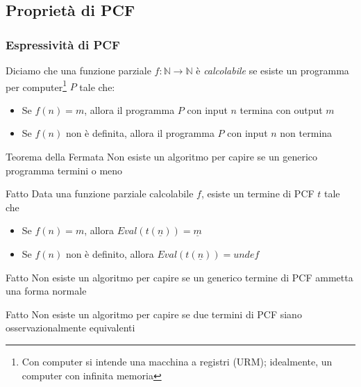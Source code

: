 \documentclass{beamer}
\begin{document}
\subsection{Proprietà di PCF}
\begin{frame}
	
	\frametitle{Espressività di PCF}
	
	Diciamo che una funzione parziale $f:\mathbb{N}\rightarrow \mathbb{N}$ è \emph{calcolabile} se esiste un programma per computer\footnote{Con computer si intende una macchina a registri (URM); idealmente, un computer con infinita memoria} $P$ tale che:
	\begin{itemize}
		\item Se $f(n)=m$, allora il programma $P$ con input $n$ termina con output $m$
		\item Se $f(n)$ non è definita, allora il programma $P$ con input $n$ non termina
	\end{itemize}
	
	
	
	\begin{block}{Teorema della Fermata}
		Non esiste un algoritmo per capire se un generico programma termini o meno
	\end{block}

	
\end{frame}

\begin{frame}
	
	\begin{block}{Fatto}
		Data una funzione parziale calcolabile $f$, esiste un termine di PCF $t$ tale che
		\begin{itemize}
			\item Se $f(n)=m$, allora $Eval(t(\underline{n}))=\underline{m}$
			\item Se $f(n)$ non è definito, allora $Eval(t(\underline{n}))=undef$
		\end{itemize}

	\end{block}
	
	\begin{block}{Fatto}
		Non esiste un algoritmo per capire se un generico termine di PCF ammetta una forma normale
	\end{block}
	
	\begin{block}{Fatto}
		Non esiste un algoritmo per capire se due termini di PCF siano osservazionalmente equivalenti
	\end{block}

	
\end{frame}
\end{document}
